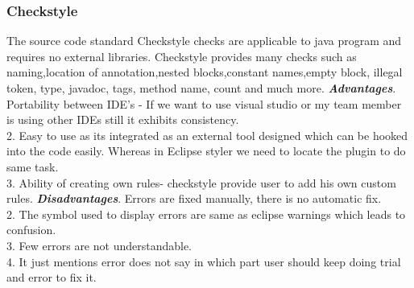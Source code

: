 \documentclass[a4paper,12pt]{article}
\begin{document}
\begin{titlepage}
\subsubsection{Checkstyle}
The source code standard Checkstyle checks are applicable to java program and requires no external libraries. Checkstyle provides many checks such as naming,location of annotation,nested blocks,constant names,empty block, illegal token, type, javadoc, tags, method name, count and much more. \newline
\newline
\textbf{\textit{Advantages}}. Portability between IDE's - If we want to use visual studio or my team member is using other IDEs still it exhibits consistency.\\
2. Easy to use as its integrated as an external tool designed which can be hooked into the code easily. Whereas in Eclipse styler we need to locate the plugin to do same task.\\
3. Ability of creating own rules- checkstyle provide user to add his own custom rules.\newline
\newline
\textbf{\textit{Disadvantages}}. Errors are fixed manually, there is no automatic fix.\\
2. The symbol used to display errors are same as eclipse warnings which leads to confusion.\\
3. Few errors are not understandable.\\
4. It just mentions error does not say in which part user should keep doing trial and error to fix it.\\

\end{titlepage}
\end{document}
